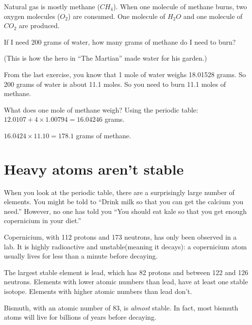 \begin{Exercise}[title={Burning Methane}, label=burning_methane]
  
Natural gas is mostly methane ($CH_4$). When one molecule of methane
burns, two oxygen molecules ($O_2$) are consumed. One molecule of
$H_2O$ and one molecule of $CO_2$ are produced.

If I need 200 grams of water, how many grams of methane do I need
to burn?

(This is how the hero in ``The Martian'' made water for his garden.)

\end{Exercise}
\begin{Answer}[ref=burning_methane]

From the last exercise, you know that 1 mole of water weighs 18.01528
grams. So 200 grams of water is about 11.1 moles. So you need to burn
11.1 moles of methane.

What does one mole of methane weigh? Using the periodic table:
$12.0107 + 4 \times 1.00794 = 16.04246$ grams.

$16.0424 \times 11.10 = 178.1$ grams of methane.
   
\end{Answer}

\section{Heavy atoms aren't stable}

When you look at the periodic table, there are a surprisingly large
number of elements. You might be told to ``Drink milk so that you can
get the calcium you need.'' However, no one has told you ``You should
eat kale so that you get enough copernicium in your diet.''

Copernicium, with 112 protons and 173 neutrons, has only been observed
 in a lab. It is highly radioactive and unstable(meaning it decays): a copernicium
atom usually lives for less than a minute before decaying.

The largest stable element is lead, which has 82 protons and between
122 and 126 neutrons. Elements with lower atomic numbers than lead,
have at least one stable isotope. Elements with higher atomic numbers
than lead don't.

Bismuth, with an atomic number of 83, is \textit{almost} stable. In fact, most
bismuth atoms will live for billions of years before decaying.
